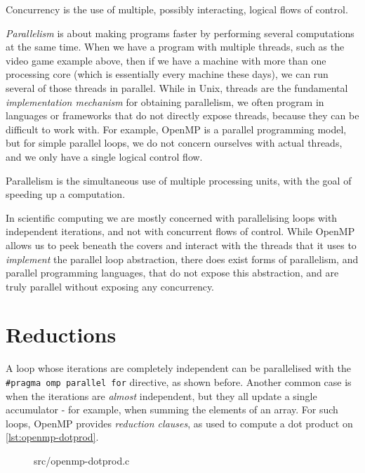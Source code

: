 \begin{definition}[Concurrency]
  Concurrency is the use of multiple, possibly interacting, logical
  flows of control.
\end{definition}

\emph{Parallelism} is about making programs faster by performing
several computations at the same time.  When we have a program with
multiple threads, such as the video game example above, then if we
have a machine with more than one processing core (which is
essentially every machine these days), we can run several of those
threads in parallel.  While in Unix, threads are the fundamental
\emph{implementation mechanism} for obtaining parallelism, we often
program in languages or frameworks that do not directly expose
threads, because they can be difficult to work with.  For example,
OpenMP is a parallel programming model, but for simple parallel loops,
we do not concern ourselves with actual threads, and we only have a
single logical control flow.

\begin{definition}[Parallelism]
  Parallelism is the simultaneous use of multiple processing units,
  with the goal of speeding up a computation.
\end{definition}

In scientific computing we are mostly concerned with parallelising
loops with independent iterations, and not with concurrent flows of
control.  While OpenMP allows us to peek beneath the covers and
interact with the threads that it uses to \textit{implement} the
parallel loop abstraction, there does exist forms of parallelism, and
parallel programming languages, that do not expose this abstraction,
and are truly parallel without exposing any concurrency.

\section{Reductions}

A loop whose iterations are completely independent can be parallelised
with the \lstinline{#pragma omp parallel for} directive, as shown
before.  Another common case is when the iterations are
\emph{almost} independent, but they all update a single accumulator
- for example, when summing the elements of an array.  For such loops,
OpenMP provides \emph{reduction clauses}, as used to compute a dot
product on \cref{lst:openmp-dotprod}.

\begin{figure}

{src/openmp-dotprod.c}
\end{figure}

